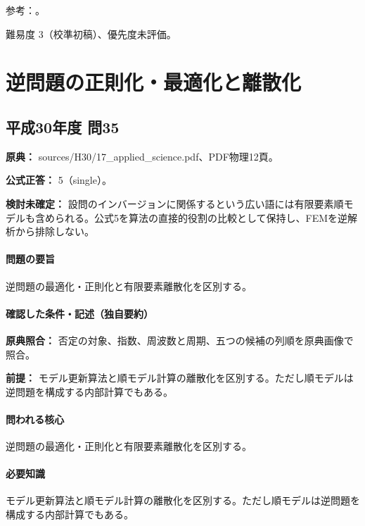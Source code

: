 \par 参考：\cite{mit_signals2010,mit_moving2012,scipy_notch,scipy_fft,usgs_processing2000,pygimli_inversion}。

\par 難易度 3（校準初稿）、優先度未評価。

\section{逆問題の正則化・最適化と離散化}

\subsection{平成30年度 問35}
\label{q:h30-reg-applied-35}

\noindent\textbf{原典：} sources/H30/17\_applied\_science.pdf、PDF物理12頁。

\textbf{公式正答：} 5（single）。

\par\textbf{検討未確定：} 設問のインバージョンに関係するという広い語には有限要素順モデルも含められる。公式5を算法の直接的役割の比較として保持し、FEMを逆解析から排除しない。

\paragraph{問題の要旨} 逆問題の最適化・正則化と有限要素離散化を区別する。

\paragraph{確認した条件・記述（独自要約）}\mbox{}\par

\noindent\textbf{原典照合：} 否定の対象、指数、周波数と周期、五つの候補の列順を原典画像で照合。\par

\noindent\textbf{前提：} モデル更新算法と順モデル計算の離散化を区別する。ただし順モデルは逆問題を構成する内部計算でもある。\par

\paragraph{問われる核心} 逆問題の最適化・正則化と有限要素離散化を区別する。

\paragraph{必要知識} モデル更新算法と順モデル計算の離散化を区別する。ただし順モデルは逆問題を構成する内部計算でもある。

